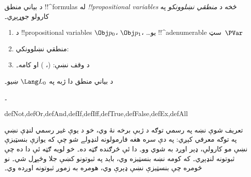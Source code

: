 \documentclass[../../../include/open-logic-section]{subfiles}
\begin{document}


د بياني منطق !!^{formula}s له \emph{!!{propositional
    variable}s} څخه د \emph{منطقي
  نښلوونکو} په کارولو جوړېږي۔

\begin{enumerate}
\item د !!{propositional variable}s $\Obj p_0$،
  $\Obj p_1$، \dots يو !!^a{denumerable} سټ~$\PVar$
\item منطقي نښلوونکي:
  \startycommalist
\item د وقف نښې: (، ) او کامه۔
\end{enumerate}

د بياني منطق دا ژبه په $\Lang L_0$ ښيو۔

۔

\begin{tagblock}{defNot,defOr,defAnd,defIf,defIff,defTrue,defFalse,defEx,defAll}
\begin{explain}
تعريف شوې نښه په رسمي توګه د ژبې برخه نۀ وي، خو د يوې غير رسمي
لنډې نښې په توګه معرفي کېږي: په دې سره هغه فارمولونه لنډولے شو چې
که يوازې بنسټيزې نښې مو کارولې، ډېر اوږد به شوي وو۔ دا ئې څرګنده
ګټه ده۔ خو لويه ګټه ئې دا ده چې ثبوتونه لنډېږي۔ که کومه نښه
بنسټيزه وي، بايد په ثبوتونو کښې جلا وڅېړل شي۔ نو څومره چې بنسټيزې
نښې ډېرې وي، هومره به زموږ ثبوتونه اوږده وي۔
\end{explain}
\end{tagblock}

\end{document}
